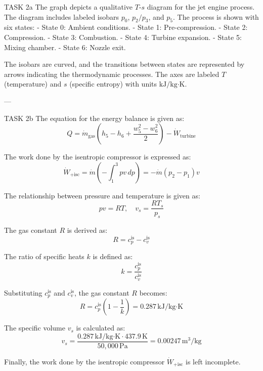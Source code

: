 TASK 2a  
The graph depicts a qualitative \( T \)-\( s \) diagram for the jet engine process. The diagram includes labeled isobars \( p_0 \), \( p_2/p_3 \), and \( p_5 \). The process is shown with six states:  
- State 0: Ambient conditions.  
- State 1: Pre-compression.  
- State 2: Compression.  
- State 3: Combustion.  
- State 4: Turbine expansion.  
- State 5: Mixing chamber.  
- State 6: Nozzle exit.  

The isobars are curved, and the transitions between states are represented by arrows indicating the thermodynamic processes. The axes are labeled \( T \) (temperature) and \( s \) (specific entropy) with units \( \text{kJ}/\text{kg·K} \).  

---

TASK 2b  
The equation for the energy balance is given as:  
\[
Q = \dot{m}_{\text{gas}} \left( h_5 - h_6 + \frac{w_5^2 - w_6^2}{2} \right) - \dot{W}_{\text{turbine}}
\]  

The work done by the isentropic compressor is expressed as:  
\[
\dot{W}_{\text{+isc}} = \dot{m} \left( - \int_{1}^{3} p v \, dp \right) = -\dot{m} \left( p_2 - p_1 \right) v
\]  

The relationship between pressure and temperature is given as:  
\[
p v = R T, \quad v_s = \frac{R T_s}{p_s}
\]  

The gas constant \( R \) is derived as:  
\[
R = c_p^{\text{is}} - c_v^{\text{is}}
\]  

The ratio of specific heats \( k \) is defined as:  
\[
k = \frac{c_p^{\text{is}}}{c_v^{\text{is}}}
\]  

Substituting \( c_p^{\text{is}} \) and \( c_v^{\text{is}} \), the gas constant \( R \) becomes:  
\[
R = c_p^{\text{is}} \left( 1 - \frac{1}{k} \right) = 0.287 \, \text{kJ}/\text{kg·K}
\]  

The specific volume \( v_s \) is calculated as:  
\[
v_s = \frac{0.287 \, \text{kJ}/\text{kg·K} \cdot 437.9 \, \text{K}}{50,000 \, \text{Pa}} = 0.00247 \, \text{m}^3/\text{kg}
\]  

Finally, the work done by the isentropic compressor \( \dot{W}_{\text{+isc}} \) is left incomplete.